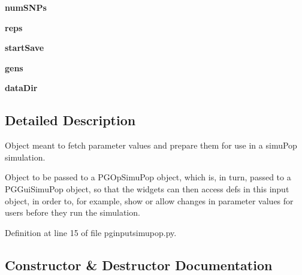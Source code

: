 \begin{DoxyCompactItemize}
\item 
{\bfseries num\+S\+N\+Ps}\hypertarget{classnegui_1_1pginputsimupop_1_1PGInputSimuPop_a1125f77d55338c88bf0d4bce14d90f5b}{}\label{classnegui_1_1pginputsimupop_1_1PGInputSimuPop_a1125f77d55338c88bf0d4bce14d90f5b}

\item 
{\bfseries reps}\hypertarget{classnegui_1_1pginputsimupop_1_1PGInputSimuPop_ad9123c2163f7ab6a1e0903bd63316ca6}{}\label{classnegui_1_1pginputsimupop_1_1PGInputSimuPop_ad9123c2163f7ab6a1e0903bd63316ca6}

\item 
{\bfseries start\+Save}\hypertarget{classnegui_1_1pginputsimupop_1_1PGInputSimuPop_a73ab30f9db93cfbd18580023886774d8}{}\label{classnegui_1_1pginputsimupop_1_1PGInputSimuPop_a73ab30f9db93cfbd18580023886774d8}

\item 
{\bfseries gens}\hypertarget{classnegui_1_1pginputsimupop_1_1PGInputSimuPop_aceb30da861b01f9f89e7b2d1fe78ba32}{}\label{classnegui_1_1pginputsimupop_1_1PGInputSimuPop_aceb30da861b01f9f89e7b2d1fe78ba32}

\item 
{\bfseries data\+Dir}\hypertarget{classnegui_1_1pginputsimupop_1_1PGInputSimuPop_a423a2c1ac08af8ba57663207700e5796}{}\label{classnegui_1_1pginputsimupop_1_1PGInputSimuPop_a423a2c1ac08af8ba57663207700e5796}

\end{DoxyCompactItemize}


\subsection{Detailed Description}
\begin{DoxyVerb}Object meant to fetch parameter values and prepare them for 
use in a simuPop simulation.  

Object to be passed to a PGOpSimuPop object, which is, in turn,
passed to a PGGuiSimuPop object, so that the widgets can then access
defs in this input object, in order to, for example, show or allow
changes in parameter values for users before they run the simulation.
\end{DoxyVerb}
 

Definition at line 15 of file pginputsimupop.\+py.



\subsection{Constructor \& Destructor Documentation}
